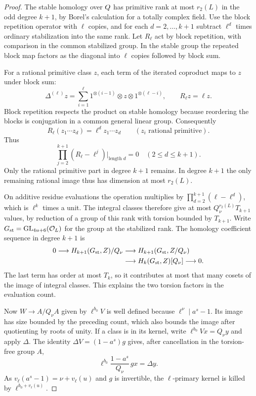 \begin{proof}
The stable homology over \(Q\) has primitive rank at
most \(r_2(L)\) in the odd degree \(k+1\), by Borel's
calculation for a totally complex field. Use the
block repetition operator with \(\ell\) copies, and for
each \(d=2,\ldots,k+1\) subtract \(\ell^d\) times
ordinary stabilization into the same rank. Let \(R_\ell\) act by block repetition, with comparison in
the common stabilized group. In the stable group the repeated block map factors as the diagonal into \(\ell\) copies followed by block sum.

For a rational primitive class \(z\), each term of the iterated coproduct maps to \(z\) under block sum:
\[
 \Delta^{(\ell)}z=\sum_{i=1}^\ell 1^{\otimes(i-1)}\otimes z\otimes1^{\otimes(\ell-i)},
 \qquad R_\ell z=\ell z.
\] Block repetition respects the product on stable homology because reordering the blocks is conjugation in a common general linear group. Consequently
\[
 R_\ell(z_1\cdots z_d)=\ell^d z_1\cdots z_d
          \qquad(z_i\text{ rational primitive}).
\] Thus
\[
            \prod_{j=2}^{k+1}(R_\ell-\ell^j)\big|_{\text{length }d}=0
              \quad(2\le d\le k+1).
\]
Only the rational primitive part in degree \(k+1\) remains. In degree \(k+1\) the only
remaining rational image thus has dimension at most
\(r_2(L)\).

On additive residue evaluations the operation
multiplies by \(\prod_{d=2}^{k+1}(\ell-\ell^d)\),
which is \(\ell^k\) times a unit. The integral classes
therefore give at most \(Q_\nu^{r_2(L)}T_{k+1}\)
values, by reduction of a group of this rank with
torsion bounded by \(T_{k+1}\). Write \(G_{\rm st}=\mathrm{GL}_{4u+6}(\mathcal O_L)\)
for the group at the stabilized rank. The homology coefficient
sequence in degree \(k+1\) is
\[
 \begin{aligned}
 0\longrightarrow H_{k+1}(G_{\rm st},Z)/Q_\nu
   &\longrightarrow H_{k+1}(G_{\rm st},Z/Q_\nu)\\
   &\longrightarrow H_k(G_{\rm st},Z)[Q_\nu]\longrightarrow0 .
 \end{aligned}
\] The last term has order at most
\(T_k\), so it contributes at most that many cosets of the
image of integral classes. This explains the two torsion
factors in the evaluation count.
\hfill\mbox{\cite{borel}}\label{cor:cohomology-height-1}

Now \(W\to A/Q_\nu A\) given by \(\ell^{b_0}V\) is
well defined because \(\ell^\nu\mid a^s-1\). Its image
has size bounded by the preceding count, which also
bounds the image after quotienting by roots of unity.
If a class is in its kernel, write
\(\ell^{b_0}Vx=Q_\nu y\) and apply \(\Delta\).
The identity \(\Delta V=(1-a^s)g\) gives, after cancellation
in the torsion-free group \(A\),
\[
       \ell^{b_0}\frac{1-a^s}{Q_\nu}\,gx=\Delta y .
\]
As \(v_\ell(a^s-1)=\nu+v_\ell(u)\) and \(g\) is invertible,
the \(\ell\)-primary kernel is killed by \(\ell^{b_0+v_\ell(u)}\).


\end{proof}
